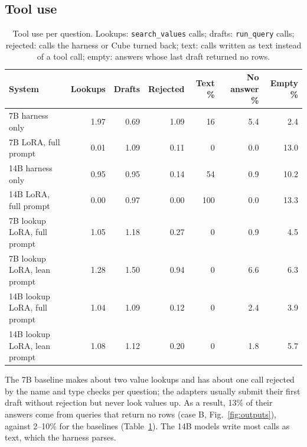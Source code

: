 \subsection{Tool use}\label{sec:tooluse}
\begin{table}[!htbp]
\centering
\footnotesize
\caption{Tool use per question. Lookups: \texttt{search\_values} calls; drafts: \texttt{run\_query} calls; rejected: calls the harness or Cube turned back; text: calls written as text instead of a tool call; empty: answers whose last draft returned no rows.}
\label{tab:tools}
\begin{tabularx}{\linewidth}{@{}Xrrrrrr@{}}
\toprule
\textbf{System} & \textbf{Lookups} & \textbf{Drafts} & \textbf{Rejected} & \textbf{Text \%} & \textbf{No answer \%} & \textbf{Empty \%}\\
\midrule
7B harness only & 1.97 & 0.69 & 1.09 & 16 & 5.4 & 2.4\\
7B LoRA, full prompt & 0.01 & 1.09 & 0.11 & 0 & 0.0 & 13.0\\
14B harness only & 0.95 & 0.95 & 0.14 & 54 & 0.9 & 10.2\\
14B LoRA, full prompt & 0.00 & 0.97 & 0.00 & 100 & 0.0 & 13.3\\
\midrule
7B lookup LoRA, full prompt & 1.05 & 1.18 & 0.27 & 0 & 0.9 & 4.5\\
7B lookup LoRA, lean prompt & 1.28 & 1.50 & 0.94 & 0 & 6.6 & 6.3\\
14B lookup LoRA, full prompt & 1.04 & 1.09 & 0.12 & 0 & 2.4 & 3.9\\
14B lookup LoRA, lean prompt & 1.08 & 1.12 & 0.20 & 0 & 1.8 & 5.7\\
\bottomrule
\end{tabularx}
\end{table}

The 7B baseline makes about two value lookups and has about one call rejected by the name and type checks per question; the adapters usually submit their first draft without rejection but never look values up. As a result, 13\% of their answers come from queries that return no rows (case B, Fig.~\ref{fig:outputs}), against 2--10\% for the baselines (Table~\ref{tab:tools}). The 14B models write most calls as text, which the harness parses.

